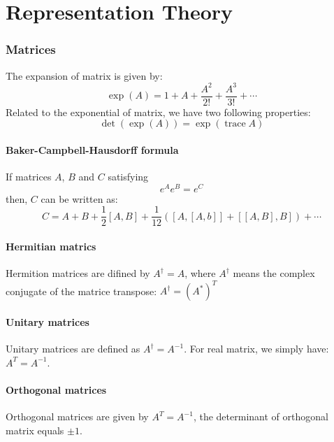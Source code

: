 \documentclass{amsart}
\theoremstyle{remark}
\theoremstyle{remark}
\theoremstyle{definition}
\DeclareMathOperator{\Tr}{trace}
\begin{document}
\part{Representation Theory}

\section*{Matrices}
The expansion of matrix is given by:
\begin{equation*}
    \exp(A) = 1+ A + \frac{A^2}{2!} + \frac{A^3}{3!} + \cdots 
\end{equation*}
Related to the exponential of matrix, we have two following properties:
\begin{equation*}
    \det(\exp(A)) = \exp(\Tr A)
\end{equation*}

\subsection*{Baker-Campbell-Hausdorff formula}
If matrices $A$, $B$ and $C$ satisfying
\begin{equation*}
    e^{A} e^{B} = e^{C}
\end{equation*}
then, $C$ can be written as:
\begin{equation*}
    C = A + B + \frac{1}{2}[A,B] + \frac{1}{12}\left( [A,[A,b]] + [[A,B],B] \right) + \cdots
\end{equation*}

\vspace{10pt}

\subsection*{Hermitian matrics}
Hermition matrices are difined by $A^{\dagger} = A$, where $A^{\dagger}$ means
the complex conjugate of the matrice transpose: $A^{\dagger} = (A^*)^{T}$

\subsection*{Unitary matrices}
Unitary matrices are defined as $A^{\dagger} = A^{-1}$. 
For real matrix, we simply have: $A^T = A^{-1}$.

\subsection*{Orthogonal matrices}
Orthogonal matrices are given by $A^T = A^{-1}$, the determinant of orthogonal
matrix equals $\pm 1$. 
\end{document}
